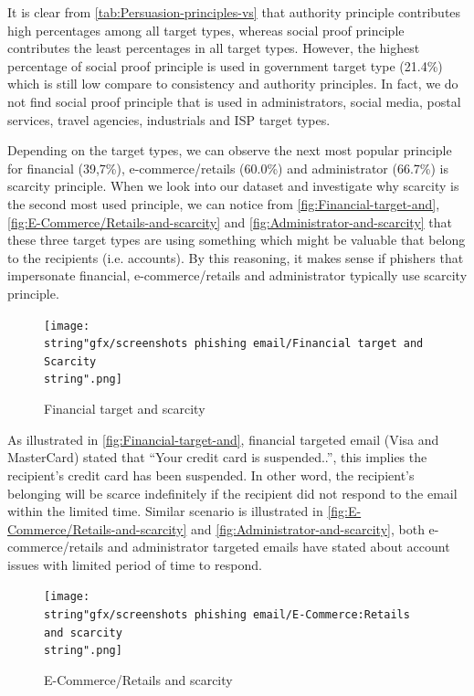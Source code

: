 It is clear from \autoref{tab:Persuasion-principles-vs} that authority
principle contributes high percentages among all target types, whereas
social proof principle contributes the least percentages in all target
types. However, the highest percentage of social proof principle is
used in government target type (21.4\%) which is still low compare
to consistency and authority principles. In fact, we do not find social
proof principle that is used in administrators, social media, postal
services, travel agencies, industrials and ISP target types. 

Depending on the target types, we can observe the next most popular
principle for financial (39,7\%), e-commerce/retails (60.0\%) and
administrator (66.7\%) is scarcity principle. When we look into our
dataset and investigate why scarcity is the second most used principle,
we can notice from \autoref{fig:Financial-target-and}, \autoref{fig:E-Commerce/Retails-and-scarcity}
and \autoref{fig:Administrator-and-scarcity} that these three target
types are using something which might be valuable that belong to the
recipients (i.e. accounts). By this reasoning, it makes sense if phishers
that impersonate financial, e-commerce/retails and administrator typically
use scarcity principle.

\begin{figure}[H]
\texttt{[image: \\string"gfx/screenshots phishing email/Financial target and Scarcity\\string".png]}\protect\caption{\label{fig:Financial-target-and}Financial target and scarcity}
\end{figure}


As illustrated in \autoref{fig:Financial-target-and}, financial targeted
email (Visa and MasterCard) stated that ``Your credit card is suspended..'',
this implies the recipient's credit card has been suspended. In other
word, the recipient's belonging will be scarce indefinitely if the
recipient did not respond to the email within the limited time. Similar
scenario is illustrated in \autoref{fig:E-Commerce/Retails-and-scarcity}
and \autoref{fig:Administrator-and-scarcity}, both e-commerce/retails
and administrator targeted emails have stated about account issues
with limited period of time to respond.

\begin{figure}[H]
\centering{}\texttt{[image: \\string"gfx/screenshots phishing email/E-Commerce:Retails and scarcity\\string".png]}\protect\caption{\label{fig:E-Commerce/Retails-and-scarcity}E-Commerce/Retails and
scarcity}
\end{figure}


